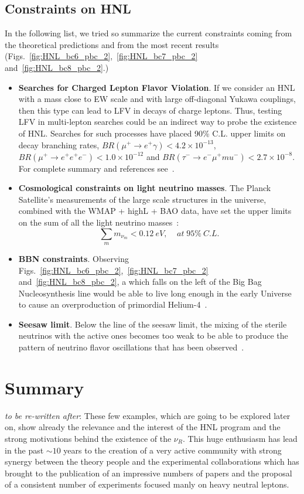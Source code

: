 \subsection{Constraints on HNL}
In the following list, we tried so summarize the current constraints
coming from the theoretical predictions and from the most recent results (Figs.~\ref{fig:HNL_bc6_pbc_2},~\ref{fig:HNL_bc7_pbc_2}
and~\ref{fig:HNL_bc8_pbc_2}.)
\begin{itemize}
\item \textbf{Searches for Charged Lepton Flavor Violation}. If we consider an HNL with a
  mass close to EW scale and with large off-diagonal Yukawa couplings,
  then this type \hnl can lead to LFV in decays of charge leptons. Thus,
  testing LFV in multi-lepton searches could be an indirect way to
  probe the existence of HNL. Searches for such processes have
  placed 90\% C.L. upper limits on decay branching rates, \ie
  $BR(\mu^+\rightarrow e^+\gamma) < 4.2\times 10^{-13}$,
  $BR(\mu^+\rightarrow e^+e^+e^-) < 1.0\times 10^{-12}$ and
  $BR(\tau^-\rightarrow e^-\mu^+mu^-) < 2.7\times 10^{-8}$. For
  complete summary and references see~\cite{Pascoli_2019}.
\item \textbf{Cosmological constraints on light neutrino masses}. The Planck
  Satellite's measurements of the large scale structures in the
  universe, combined with the WMAP + highL + BAO data, have set the
  upper limits on the sum of all the light neutrino
  masses~\cite{Aghanim:2018eyx}: 
\begin{equation}
\label{eq:summasses}
\sum_{m} m_{\nu_m} < 0.12 \: eV, \;\;\;\; at \;95\% \: C.L.
\end{equation}
\item \textbf{BBN constraints}. Observing
  Figs.~\ref{fig:HNL_bc6_pbc_2},~\ref{fig:HNL_bc7_pbc_2}
  and~\ref{fig:HNL_bc8_pbc_2}, a \hnl which falls on the left of the
  Big Bag Nucleosynthesis line would be able to live long enough in
  the early Universe to cause an overproduction of primordial
  Helium-4~\cite{Ruchayskiy_2012}.
\item \textbf{Seesaw limit}. Below the line of the seesaw limit, the
  mixing of the sterile neutrinos with the active ones becomes too
  weak to be able to produce the pattern of neutrino flavor oscillations that has been observed~\cite{Canetti_2010}. 
\end{itemize}



\section{Summary}
\emph{to be re-written after}:
These few examples, which are going to be explored later on, show already the relevance and the interest of the HNL program and the strong motivations behind the existence of the $\nu_{R}$. This huge enthusiasm has lead in the past $\sim10$ years to the creation of a very active community with strong synergy between the theory people and the experimental collaborations which has brought to the publication of an impressive numbers of papers and the proposal of a consistent number of experiments focused manly on heavy neutral leptons. 






\clearpage

